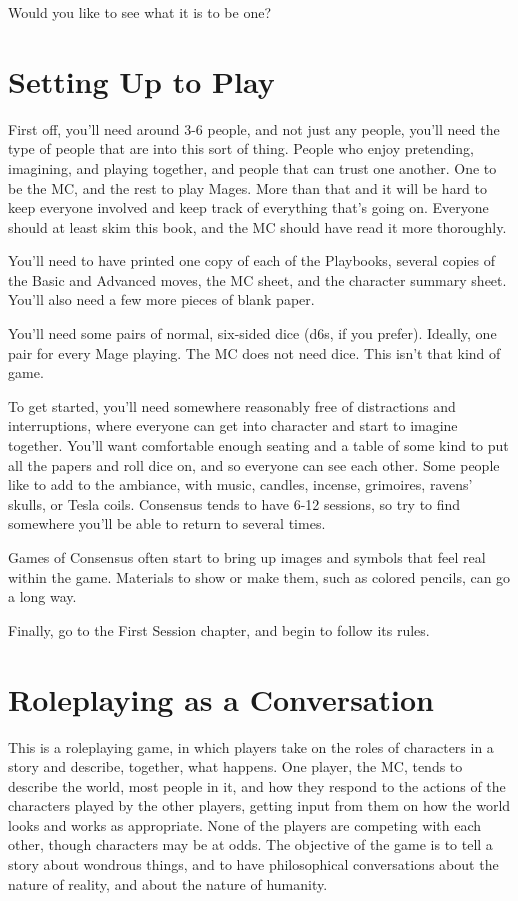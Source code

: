 \documentclass[10pt,twoside,openright]{memoir}
\begin{document}
Would you like to see what it is to be one?

\hypertarget{setting-up-to-play}{%
\section{Setting Up to Play}\label{setting-up-to-play}}

First off, you'll need around 3-6 people, and not just any people,
you'll need the type of people that are into this sort of thing. People
who enjoy pretending, imagining, and playing together, and people that
can trust one another. One to be the MC, and the rest to play Mages.
More than that and it will be hard to keep everyone involved and keep
track of everything that's going on. Everyone should at least skim this
book, and the MC should have read it more thoroughly.

You'll need to have printed one copy of each of the Playbooks, several
copies of the Basic and Advanced moves, the MC sheet, and the character
summary sheet. You'll also need a few more pieces of blank paper.

You'll need some pairs of normal, six-sided dice (d6s, if you prefer).
Ideally, one pair for every Mage playing. The MC does not need dice.
This isn't that kind of game.

To get started, you'll need somewhere reasonably free of distractions
and interruptions, where everyone can get into character and start to
imagine together. You'll want comfortable enough seating and a table of
some kind to put all the papers and roll dice on, and so everyone can
see each other. Some people like to add to the ambiance, with music,
candles, incense, grimoires, ravens' skulls, or Tesla coils. Consensus
tends to have 6-12 sessions, so try to find somewhere you'll be able to
return to several times.

Games of Consensus often start to bring up images and symbols that feel
real within the game. Materials to show or make them, such as colored
pencils, can go a long way.

Finally, go to the First Session chapter, and begin to follow its rules.

\hypertarget{roleplaying-as-a-conversation}{%
\section{Roleplaying as a
Conversation}\label{roleplaying-as-a-conversation}}

This is a roleplaying game, in which players take on the roles of
characters in a story and describe, together, what happens. One player,
the MC, tends to describe the world, most people in it, and how they
respond to the actions of the characters played by the other players,
getting input from them on how the world looks and works as appropriate.
None of the players are competing with each other, though characters may
be at odds. The objective of the game is to tell a story about wondrous
things, and to have philosophical conversations about the nature of
reality, and about the nature of humanity.
\end{document}
